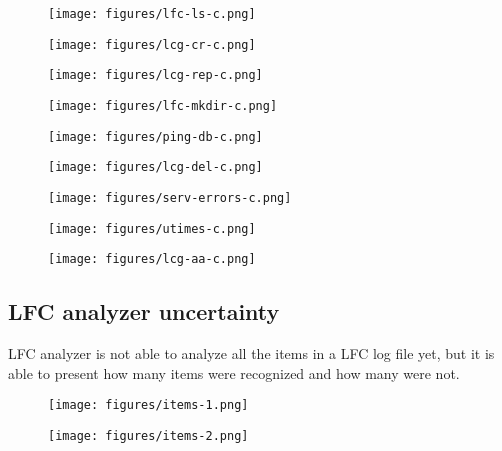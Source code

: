 \documentclass[a4paper, 11pt]{article} %
\begin{document}
\begin{figure}[H]
  \centering
    \texttt{[image: figures/lfc-ls-c.png]}
\end{figure}
\begin{figure}[H]
  \centering
    \texttt{[image: figures/lcg-cr-c.png]}
\end{figure}
\begin{figure}[H]
  \centering
    \texttt{[image: figures/lcg-rep-c.png]}
\end{figure}
\begin{figure}[H]
  \centering
    \texttt{[image: figures/lfc-mkdir-c.png]}
\end{figure}
\begin{figure}[H]
  \centering
    \texttt{[image: figures/ping-db-c.png]}
\end{figure}
\begin{figure}[H]
  \centering
    \texttt{[image: figures/lcg-del-c.png]}
\end{figure}
\begin{figure}[H]
  \centering
    \texttt{[image: figures/serv-errors-c.png]}
\end{figure}
\begin{figure}[H]
  \centering
    \texttt{[image: figures/utimes-c.png]}
\end{figure}
\begin{figure}[H]
  \centering
    \texttt{[image: figures/lcg-aa-c.png]}
\end{figure}

\subsection{LFC analyzer uncertainty}

LFC analyzer is not able to analyze all the items in a LFC log file yet, but it is able to present how many items were recognized and how many were not.

\begin{figure}[H]
  \centering
    \texttt{[image: figures/items-1.png]}
\end{figure}

\begin{figure}[H]
  \centering
    \texttt{[image: figures/items-2.png]}
\end{figure}
\end{document}
